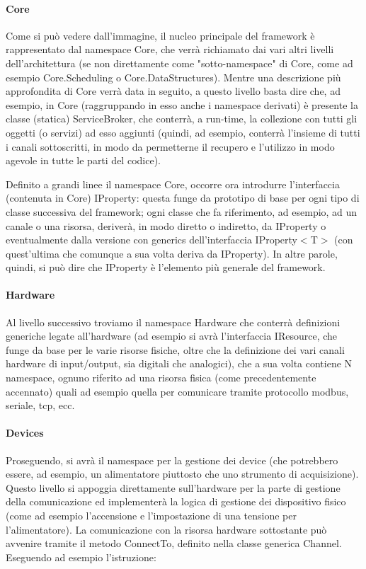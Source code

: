 \documentclass{article}
\begin{document}
		\paragraph*{Core}
		Come si può vedere dall'immagine, il nucleo principale del framework è rappresentato dal namespace Core, che verrà richiamato dai vari altri livelli dell'architettura (se non direttamente come "sotto-namespace" di Core, come ad esempio Core.Scheduling o Core.DataStructures).
		\newline
		Mentre una descrizione più approfondita di Core verrà data in seguito, a questo livello basta dire che, ad esempio, in Core (raggruppando in esso anche i namespace derivati) è presente la classe (statica) ServiceBroker, che conterrà, a run-time, la collezione con tutti gli oggetti (o servizi) ad esso aggiunti (quindi, ad esempio, conterrà l'insieme di tutti i canali sottoscritti, in modo da permetterne il recupero e l'utilizzo in modo agevole in tutte le parti del codice).		
		\par
		Definito a grandi linee il namespace Core, occorre ora introdurre l'interfaccia (contenuta in Core) IProperty: questa funge da prototipo di base per ogni tipo di classe successiva del framework; ogni classe che fa riferimento, ad esempio, ad un canale o una risorsa, deriverà, in modo diretto o indiretto, da IProperty o eventualmente dalla versione con generics dell'interfaccia IProperty$<$T$>$ (con quest'ultima che comunque a sua volta deriva da IProperty).
		\newline
		In altre parole, quindi, si può dire che IProperty è l'elemento più generale del framework.
		
		\paragraph*{Hardware}
		Al livello successivo troviamo il namespace Hardware che conterrà definizioni generiche legate all'hardware (ad esempio si avrà l'interfaccia IResource, che funge da base per le varie risorse fisiche, oltre che la definizione dei vari canali hardware di input/output, sia digitali che analogici), che a sua volta contiene N namespace, ognuno riferito ad una risorsa fisica (come precedentemente accennato) quali ad esempio quella per comunicare tramite protocollo modbus, seriale, tcp, ecc.
		
		\paragraph*{Devices}
		Proseguendo, si avrà il namespace per la gestione dei device (che potrebbero essere, ad esempio, un alimentatore piuttosto che uno strumento di acquisizione). Questo livello si appoggia direttamente sull'hardware per la parte di gestione della comunicazione ed implementerà la logica di gestione dei dispositivo fisico (come ad esempio l'accensione e l'impostazione di una tensione per l'alimentatore).
		\newline
		La comunicazione con la risorsa hardware sottostante può avvenire tramite il metodo ConnectTo, definito nella classe generica Channel. Eseguendo ad esempio l'istruzione:
		
\end{document}
